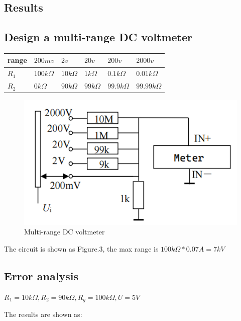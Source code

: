\documentclass[a4paper]{article}
\begin{document}
\begin{multicols*}{2}
    \section*{Results}

    \subsection*{Design a multi-range DC voltmeter}

    \begin{tabular}{l|l|l|l|l|l}
        range & $200mv$      & $2v$        & $20v$       & $200v$        & $2000v$        \\ \hline
        $R_1$ & $100k\Omega$ & $10k\Omega$ & $1k\Omega$  & $0.1k\Omega$  & $0.01k\Omega$  \\
        $R_2$ & $0k\Omega$   & $90k\Omega$ & $99k\Omega$ & $99.9k\Omega$ & $99.99k\Omega$
    \end{tabular}

    \begin{figure}[H]
        \centering
        \includegraphics[width=0.8\linewidth]{./img/Fig.3.png}
        \caption{Multi-range DC voltmeter}
        \label{fig:figure3}
    \end{figure}

    The circuit is shown as Figure.3, the max range is $100k\Omega * 0.07A = 7kV$

    \subsection*{Error analysis}

    $R_1 = 10k\Omega, R_2 = 90k\Omega, R_g = 100k\Omega, U=5V$

    The results are shown as:


\end{multicols*}
\end{document}
